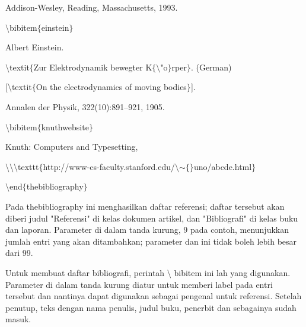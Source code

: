 \begin{itemize}
\hspace*{0.5in}Addison-Wesley, Reading, Massachusetts, 1993.\par

\hspace*{0.5in}$\setminus$bibitem$ \{ $einstein$ \} $ \par

\hspace*{0.5in}Albert Einstein. \par

\hspace*{0.5in}$\setminus$textit$ \{ $Zur Elektrodynamik bewegter K$ \{ $$\setminus$"o$ \} $rper$ \} $. (German) \par

\hspace*{0.5in}[$\setminus$textit$ \{ $On the electrodynamics of moving bodies$ \} $]. \par

\hspace*{0.5in}Annalen der Physik, 322(10):891–921, 1905. \par

\hspace*{0.5in}$\setminus$bibitem$ \{ $knuthwebsite$ \} $ \par

\hspace*{0.5in}Knuth: Computers and Typesetting,\par

\hspace*{0.5in}$\setminus$$\setminus$$\setminus$texttt$ \{ $http://www-cs-faculty.stanford.edu/$\setminus$$ \sim $$ \{ $$ \} $uno/abcde.html$ \} $\par

\hspace*{0.5in}$\setminus$end$ \{ $thebibliography$ \} $\par

Pada thebibliography ini menghasilkan daftar referensi; daftar tersebut akan diberi judul "Referensi" di kelas dokumen artikel, dan "Bibliografi" di kelas buku dan laporan. Parameter di dalam tanda kurung, 9 pada contoh, menunjukkan jumlah entri yang akan ditambahkan; parameter dan ini tidak boleh lebih besar dari 99.\par

Untuk membuat daftar bibliografi, perintah $\setminus$ bibitem ini lah yang digunakan. Parameter di dalam tanda kurung diatur untuk memberi label pada entri tersebut dan nantinya dapat digunakan sebagai pengenal untuk referensi. Setelah penutup, teks dengan nama penulis, judul buku, penerbit dan sebagainya sudah masuk.\par


\end{itemize}
